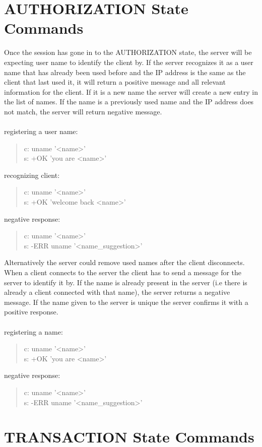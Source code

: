 \documentclass[a4paper,11pt]{article}
\begin{document}
\section{AUTHORIZATION State Commands}
Once the session has gone in to the AUTHORIZATION state, the server will be expecting user name to identify the client by. If the server recognizes it as a user name that has already been used before and the IP address is the same as the client that last used it, it will return a positive message and all relevant information for the client. If it is a new name the server will create a new entry in the list of names. If the name is a previously used name and the IP address does not match, the server will return negative message.\\\\
registering a user name:
\begin{quote}
  c: uname '<name>'\\
  s: +OK 'you are <name>'
\end{quote}
\noindent
recognizing client:
\begin{quote}
  c: uname '<name>'\\
  s: +OK 'welcome back <name>'
\end{quote}
\noindent
negative response:
\begin{quote}
  c: uname '<name>'\\
  s: -ERR uname '<name\_suggestion>'
\end{quote}


Alternatively the server could remove used names after the client disconnects. When a client connects to the server the client has to send a message for the server to identify it by. If the name is already present in the server (i.e there is already a client connected with that name), the server returns a negative message. If the name given to the server is unique the server confirms it with a positive response.\\\\
registering a name:

\begin{quote}
  c: uname '<name>'\\
  s: +OK 'you are <name>'
\end{quote}
\noindent
negative response:
\begin{quote}
  c: uname '<name>'\\
  s: -ERR uname '<name\_suggestion>'
\end{quote}


\clearpage
\section{TRANSACTION State Commands}
\end{document}
